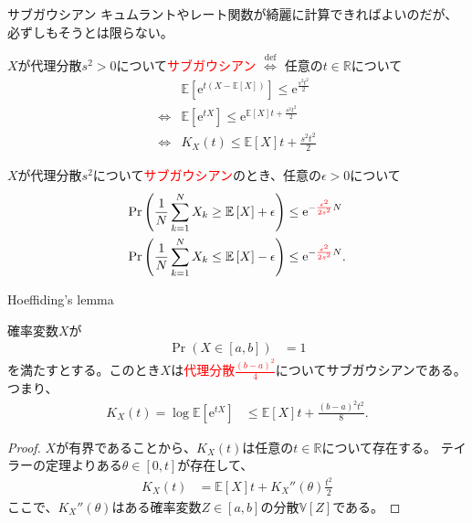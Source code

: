 \documentclass[lualatex,handout]{beamer}
\newcommand{\emm}[1]{\textcolor{red}{#1}}
\newcommand{\expt}[1]{\mathbb{E}\left[#1\right]}
\newcommand{\var}[1]{\mathbb{V}\left[#1\right]}
\theoremstyle{definition}
\begin{document}
\begin{frame}{サブガウシアン}
\small
キュムラントやレート関数が綺麗に計算できればよいのだが、必ずしもそうとは限らない。

\vspace{1em}
$X$が代理分散$s^2>0$について\emm{サブガウシアン} $\stackrel{\mathrm{def}}{\iff}$ 任意の$t\in\mathbb{R}$について
\begin{align*}
&\expt{\mathrm{e}^{t(X-\expt{X})}} \le \mathrm{e}^{\frac{s^2t^2}2}\\
\iff&\expt{\mathrm{e}^{tX}} \le \mathrm{e}^{\expt{X}t+\frac{s^2t^2}2}\\
\iff& K_X(t) \le {\expt{X}t+\frac{s^2t^2}2}
\end{align*}

\vspace{1em}
$X$が代理分散$s^2$について\emm{サブガウシアン}のとき、任意の$\epsilon>0$について
\begin{align*}
\Pr\left(\frac1N\sum_{k=1}^N X_k \ge \expt{X} + \epsilon\right) &\le \mathrm{e}^{-\emm{\frac{\epsilon^2}{2s^2}}N}\\
\Pr\left(\frac1N\sum_{k=1}^N X_k \le \expt{X} - \epsilon\right) &\le \mathrm{e}^{-\emm{\frac{\epsilon^2}{2s^2}}N}.
\end{align*}
\end{frame}

\begin{frame}{Hoeffiding's lemma}
\small
\begin{lemma}
確率変数$X$が
\begin{align*}
\Pr(X\in[a,b])&=1
\end{align*}
を満たすとする。このとき$X$は\emm{代理分散$\frac{(b-a)^2}4$}についてサブガウシアンである。
つまり、
\begin{align*}
K_X(t)=\log\expt{\mathrm{e}^{tX}} &\le \expt{X}t + \frac{(b-a)^2t^2}8.
\end{align*}
\end{lemma}
\begin{proof}
$X$が有界であることから、$K_X(t)$は任意の$t\in\mathbb{R}$について存在する。
テイラーの定理よりある$\theta\in[0,t]$が存在して、
\begin{align*}
K_X(t) &= \expt{X}t + K_X''(\theta)\frac{t^2}2
\end{align*}
ここで、$K_X''(\theta)$はある確率変数$Z\in[a,b]$の分散$\var{Z}$である。
\end{proof}
\end{frame}
\end{document}
